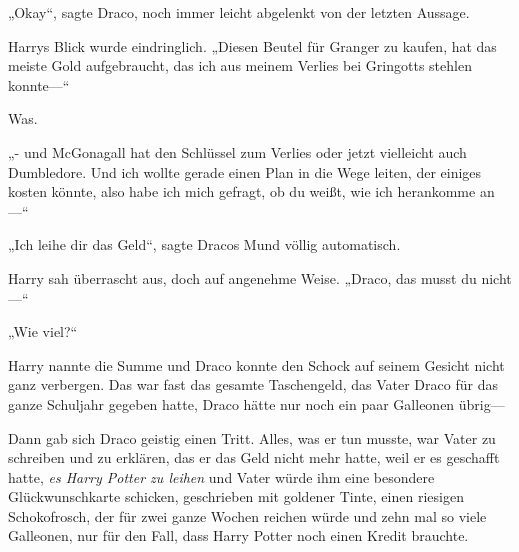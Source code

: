 „Okay“, sagte Draco, noch immer leicht abgelenkt von der letzten Aussage.

Harrys Blick wurde eindringlich. „Diesen Beutel für Granger zu kaufen, hat das meiste Gold aufgebraucht, das ich aus meinem Verlies bei Gringotts stehlen konnte—“

Was.

„- und McGonagall hat den Schlüssel zum Verlies oder jetzt vielleicht auch Dumbledore. Und ich wollte gerade einen Plan in die Wege leiten, der einiges kosten könnte, also habe ich mich gefragt, ob du weißt, wie ich herankomme an—“

„Ich leihe dir das Geld“, sagte Dracos Mund völlig automatisch.

Harry sah überrascht aus, doch auf angenehme Weise. „Draco, das musst du nicht—“

„Wie viel?“

Harry nannte die Summe und Draco konnte den Schock auf seinem Gesicht nicht ganz verbergen. Das war fast das gesamte Taschengeld, das Vater Draco für das ganze Schuljahr gegeben hatte, Draco hätte nur noch ein paar Galleonen übrig—

Dann gab sich Draco geistig einen Tritt. Alles, was er tun musste, war Vater zu schreiben und zu erklären, das er das Geld nicht mehr hatte, weil er es geschafft hatte, \emph{es Harry Potter zu leihen} und Vater würde ihm eine besondere Glückwunschkarte schicken, geschrieben mit goldener Tinte, einen riesigen Schokofrosch, der für zwei ganze Wochen reichen würde und zehn mal so viele Galleonen, nur für den Fall, dass Harry Potter noch einen Kredit brauchte.

